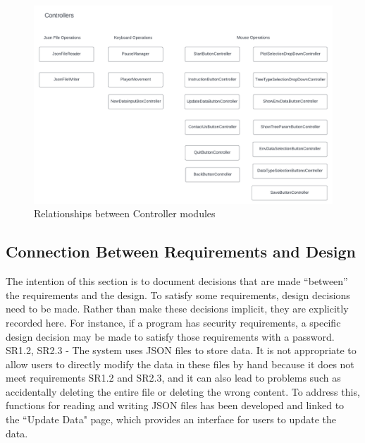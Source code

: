 \documentclass[12pt, titlepage]{article}
\begin{document}
\newpage

\begin{figure}[H]
\caption{Relationships between Controller modules}
\includegraphics[scale=0.65]{SysDesPic/Controller-Modules.png}
\end{figure}

\newpage

\subsection{Connection Between Requirements and Design}

\label{SecConnection}

The intention of this section is to document decisions that are made
  ``between'' the requirements and the design.  To satisfy some requirements,
  design decisions need to be made.  Rather than make these decisions implicit,
  they are explicitly recorded here.  For instance, if a program has security
  requirements, a specific design decision may be made to satisfy those
  requirements with a password.\\
  
\noindent SR1.2, SR2.3 - The system uses JSON files to store data. It is not appropriate to
allow users to directly modify the data in these files by hand because it does not meet
requirements SR1.2 and SR2.3, and it can also lead to problems such as accidentally deleting
the entire file or deleting the wrong content. To address this, functions for reading and
writing JSON files has been developed and linked to the ``Update Data" page, which provides an
interface for users to update the data.\\
\end{document}
